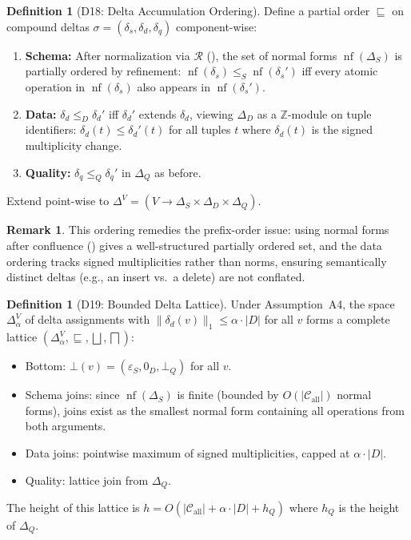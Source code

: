 \documentclass[11pt,a4paper]{article}
\theoremstyle{definition}
\newtheorem{definition}[theorem]{Definition}
\newtheorem{remark}[theorem]{Remark}
\newcommand{\DeltaS}{\Delta_{\!S}}
\newcommand{\DeltaD}{\Delta_{\!D}}
\newcommand{\DeltaQ}{\Delta_{\!Q}}
\newcommand{\epsS}{\varepsilon_S}
\newcommand{\zeroD}{0_D}
\newcommand{\botQ}{\bot_Q}
\DeclareMathOperator{\nf}{nf}
\begin{document}
\begin{definition}[D18: Delta Accumulation Ordering]\label{def:delta-order}
Define a partial order $\sqsubseteq$ on compound deltas
$\sigma = (\delta_s, \delta_d, \delta_q)$ component-wise:
\begin{enumerate}[nosep]
  \item \textbf{Schema:} After normalization via $\mathcal{R}$
    (), the set of normal forms $\nf(\DeltaS)$ is
    partially ordered by refinement: $\nf(\delta_s) \leq_S \nf(\delta_s')$ iff
    every atomic operation in $\nf(\delta_s)$ also appears in $\nf(\delta_s')$.
  \item \textbf{Data:} $\delta_d \leq_D \delta_d'$ iff $\delta_d'$ extends
    $\delta_d$, viewing $\DeltaD$ as a $\mathbb{Z}$-module on tuple identifiers:
    $\delta_d(t) \le \delta_d'(t)$ for all tuples $t$ where $\delta_d(t)$ is
    the signed multiplicity change.
  \item \textbf{Quality:} $\delta_q \leq_Q \delta_q'$ in $\DeltaQ$ as before.
\end{enumerate}
Extend point-wise to $\Delta^V = (V \to \DeltaS \times \DeltaD \times \DeltaQ)$.
\end{definition}

\begin{remark}
This ordering remedies the prefix-order issue: using normal forms after
confluence () gives a well-structured partially ordered set,
and the data ordering tracks signed multiplicities rather than norms, ensuring
semantically distinct deltas (e.g., an insert vs.\ a delete) are not
conflated.
\end{remark}

\begin{definition}[D19: Bounded Delta Lattice]\label{def:delta-lattice}
Under Assumption~A4, the space $\Delta^V_\alpha$ of delta assignments with
$\|\delta_d(v)\|_1 \leq \alpha \cdot |D|$ for all $v$ forms a complete lattice
$(\Delta^V_\alpha, \sqsubseteq, \bigsqcup, \bigsqcap)$:
\begin{itemize}[nosep]
  \item Bottom: $\bot(v) = (\epsS, \zeroD, \botQ)$ for all $v$.
  \item Schema joins: since $\nf(\DeltaS)$ is finite (bounded by $O(|\mathcal{C}_{\mathrm{all}}|)$
    normal forms), joins exist as the smallest normal form containing all
    operations from both arguments.
  \item Data joins: pointwise maximum of signed multiplicities, capped at
    $\alpha \cdot |D|$.
  \item Quality: lattice join from $\DeltaQ$.
\end{itemize}
The height of this lattice is $h = O(|\mathcal{C}_{\mathrm{all}}| + \alpha \cdot |D| + h_Q)$
where $h_Q$ is the height of $\DeltaQ$.
\end{definition}
\end{document}

